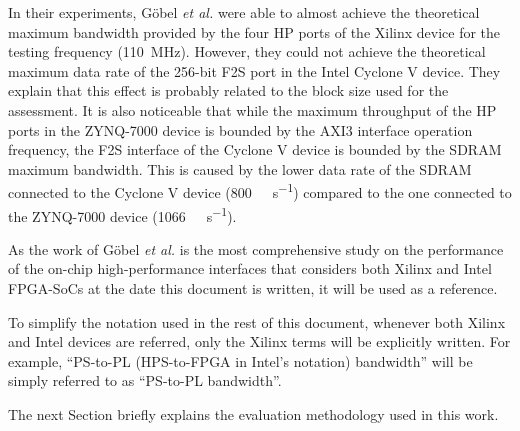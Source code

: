 

In their experiments, G{\"{o}}bel \textit{et al.} were able to almost achieve the theoretical maximum bandwidth provided by the four \ac{HP} ports of the Xilinx device for the testing frequency (\SI{110}{\mega\hertz}). However, they could not achieve the theoretical maximum data rate of the 256-bit \ac{F2S} port in the Intel Cyclone V device. They explain that this effect is probably related to the block size used for the assessment. It is also noticeable that while the maximum throughput of the \ac{HP} ports in the ZYNQ-7000 device is bounded by the AXI3 interface operation frequency, the \ac{F2S} interface of the Cyclone V device is bounded by the SDRAM maximum bandwidth. This is caused by the lower data rate of the SDRAM connected to the Cyclone V device (\SI{800}{\mega\transfer\per\second}) compared to the one connected to the ZYNQ-7000 device (\SI{1066}{\mega\transfer\per\second}).

As the work of G{\"{o}}bel \textit{et al.} is the most comprehensive study on the performance of the on-chip high-performance interfaces that considers both Xilinx and Intel \ac{FPGA}-\acp{SoC} at the date this document is written, it will be used as a reference.

To simplify the notation used in the rest of this document, whenever both Xilinx and Intel devices are referred, only the Xilinx terms will be explicitly written. For example, ``\ac{PS}-to-\ac{PL} (\ac{HPS}-to-\ac{FPGA} in Intel's notation) bandwidth'' will be simply referred to as ``\ac{PS}-to-\ac{PL} bandwidth''.

The next Section briefly explains the evaluation methodology used in this work.